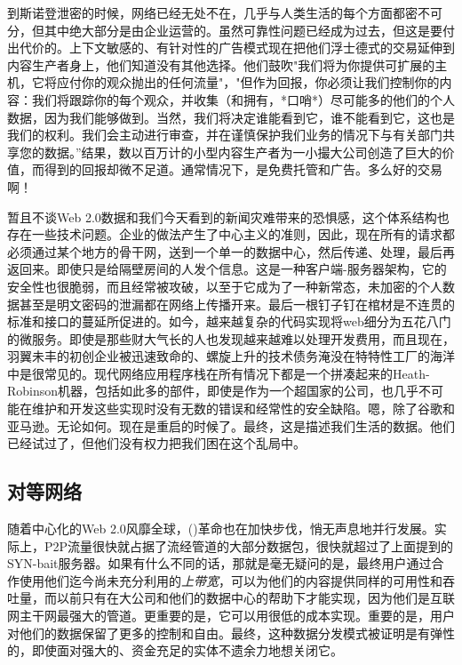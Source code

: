 到斯诺登泄密的时候，网络已经无处不在，几乎与人类生活的每个方面都密不可分，但其中绝大部分是由企业运营的。虽然可靠性问题已经成为过去，但这是要付出代价的。上下文敏感的、有针对性的广告模式现在把他们浮士德式的交易延伸到内容生产者身上，他们知道没有其他选择。他们鼓吹"我们将为你提供可扩展的主机，它将应付你的观众抛出的任何流量"，"但作为回报，你必须让我们控制你的内容：我们将跟踪你的每个观众，并收集（和拥有，*口哨*）尽可能多的他们的个人数据，因为我们能够做到。当然，我们将决定谁能看到它，谁不能看到它，这也是我们的权利。我们会主动进行审查，并在谨慎保护我们业务的情况下与有关部门共享您的数据。”结果，数以百万计的小型内容生产者为一小撮大公司创造了巨大的价值，而得到的回报却微不足道。通常情况下，是免费托管和广告。多么好的交易啊！

暂且不谈Web 2.0数据和我们今天看到的新闻灾难带来的恐惧感，这个体系结构也存在一些技术问题。企业的做法产生了中心主义的准则，因此，现在所有的请求都必须通过某个地方的骨干网，送到一个单一的数据中心，然后传递、处理，最后再返回来。即使只是给隔壁房间的人发个信息。这是一种客户端-服务器架构，它的安全性也很脆弱，而且经常被攻破，以至于它成为了一种新常态，未加密的个人数据甚至是明文密码的泄漏都在网络上传播开来。最后一根钉子钉在棺材是不连贯的标准和接口的蔓延所促进的。如今，越来越复杂的代码实现将web细分为五花八门的微服务。即使是那些财大气长的人也发现越来越难以处理开发费用，而且现在，羽翼未丰的初创企业被迅速致命的、螺旋上升的技术债务淹没在特特性工厂的海洋中是很常见的。现代网络应用程序栈在所有情况下都是一个拼凑起来的Heath-Robinson机器，包括如此多的部件，即使是作为一个超国家的公司，也几乎不可能在维护和开发这些实现时没有无数的错误和经常性的安全缺陷。嗯，除了谷歌和亚马逊。无论如何。现在是重启的时候了。最终，这是描述我们生活的数据。他们已经试过了，但他们没有权力把我们困在这个乱局中。


\subsection{对等网络\statusgreen}\label{sec:peer_to_peer}

随着中心化的Web 2.0风靡全球，()革命也在加快步伐，悄无声息地并行发展。实际上，P2P流量很快就占据了流经管道的大部分数据包，很快就超过了上面提到的SYN-bait服务器。如果有什么不同的话，那就是毫无疑问的是，最终用户通过合作使用他们迄今尚未充分利用的\emph{上带宽}，可以为他们的内容提供同样的可用性和吞吐量，而以前只有在大公司和他们的数据中心的帮助下才能实现，因为他们是互联网主干网最强大的管道。更重要的是，它可以用很低的成本实现。重要的是，用户对他们的数据保留了更多的控制和自由。最终，这种数据分发模式被证明是有弹性的，即使面对强大的、资金充足的实体不遗余力地想关闭它。

